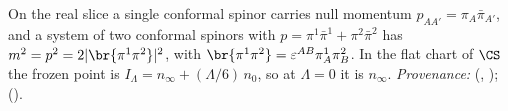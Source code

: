 On the real slice a single conformal spinor carries null momentum $p_{AA'} = \pi_{A}\bar\pi_{A'}$, and a system of two conformal spinors with $p = \pi^{1}\bar\pi^{1} + \pi^{2}\bar\pi^{2}$ has $m^{2} = p^{2} = 2|\br{\pi^{1}\pi^{2}}|^{2}$, with $\br{\pi^{1}\pi^{2}} = \varepsilon^{AB}\pi^{1}_{A}\pi^{2}_{B}$. In the flat chart of $\CS$ the frozen point is $I_{\Lambda} = n_{\infty} + (\Lambda/6)\,n_{0}$, so at $\Lambda = 0$ it is $n_{\infty}$. \emph{Provenance:} \cite[Prop.~4.1, Lem.~5.1]{ButlerT11} (, ); \cite[Fact~2.5]{ButlerT12} ().
